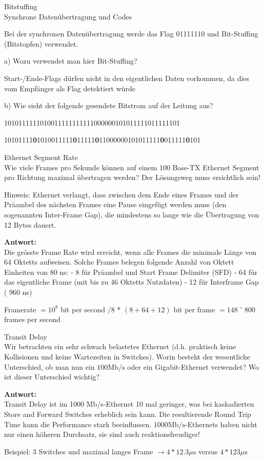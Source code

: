 \begin{example2}{Bitstuffing}\\
Synchrone Datenübertragung und Codes

Bei der synchronen Datenübertragung werde das Flag 01111110 und Bit-Stuffing (Bitstopfen) verwendet.

a) Wozu verwendet man hier Bit-Stuffing?

Start-/Ende-Flags dürfen nicht in den eigentlichen Daten vorkommen, da dies vom Empfänger als Flag detektiert würde

b) Wie sieht der folgende gesendete Bitstrom auf der Leitung aus?

1010111111010011111111111000000101011111011111101

10101111\textbf{0}1010011111\textbf{0}11111\textbf{0}11000000101011111\textbf{0}011111\textbf{0}101
\end{example2}
\begin{example2}{Ethernet Segment Rate}\\
Wie viele Frames pro Sekunde können auf einem 100 Base-TX Ethernet Segment pro Richtung maximal übertragen werden? Der Lösungsweg muss ersichtlich sein!

Hinweis: Ethernet verlangt, dass zwischen dem Ende eines Frames und der Präambel des nächsten Frames eine Pause eingefügt werden muss (den sogenannten Inter-Frame Gap), die mindestens so lange wie die Übertragung von 12 Bytes dauert.

\textbf{Antwort:}\\
Die grösste Frame Rate wird erreicht, wenn alle Frames die minimale Länge von 64 Oktetts aufweisen. Solche Frames belegen folgende Anzahl von Oktett Einheiten von 80 ns:
- 8 für Präambel und Start Frame Delimiter (SFD)
- 64 für das eigentliche Frame (mit bis zu 46 Oktetts Nutzdaten)
- 12 für Interframe Gap ( 960 ns)

Framerate $=10^{8}$ bit per second $/ 8$ * $(8+64+12)$ bit per frame $=148$ ' 800 frames per second
\end{example2}
\begin{example2}{Transit Delay}\\
Wir betrachten ein sehr schwach belastetes Ethernet (d.h. praktisch keine Kollisionen und keine Wartezeiten in Switches). Worin besteht der wesentliche Unterschied, ob man nun ein $100 \mathrm{Mb} / \mathrm{s}$ oder ein Gigabit-Ethernet verwendet? Wo ist dieser Unterschied wichtig?

\textbf{Antwort:}\\
Transit Delay ist im 1000 Mb/s-Ethernet 10 mal geringer, was bei kaskadierten Store and Forward Switches erheblich sein kann. Die resultierende Round Trip Time kann die Performance stark beeinflussen. $1000 \mathrm{Mb} / \mathrm{s}$-Ethernets haben nicht nur einen höheren Durchsatz, sie sind auch reaktionsfreudiger!

Beispiel: 3 Switches und maximal langes Frame $\rightarrow 4 * 12.3 \mu \mathrm{s}$ versus $4 * 123 \mu \mathrm{s}$
\end{example2}
